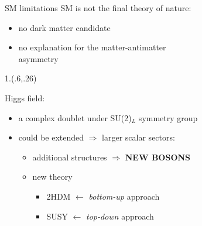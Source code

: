 \documentclass[10pt,UKenglish, leqno, xcolor = dvipsnames]{beamer}
\begin{document}
	\begin{frame}{SM limitations}
		\vfill
		SM is not the final theory of nature:
		\begin{itemize}
			\item no dark matter candidate  
			\item no explanation for the matter-antimatter\\ asymmetry 
		\end{itemize}
		\begin{textblock}{1.}(.6,.26)
		\end{textblock}
		\vspace{1cm}
		Higgs field:
		\begin{itemize}
			\item a complex doublet under SU(2)$_L$ symmetry group
			\item could be extended $\Rightarrow$ larger scalar sectors:
			\begin{itemize}
				\item additional structures $\Rightarrow$ \textbf{NEW BOSONS}
				\item new theory
				\begin{itemize}
					\item 2HDM $\leftarrow$ \textit{bottom-up} approach
					\item SUSY $\leftarrow$ \textit{top-down} approach
				\end{itemize}
			\end{itemize} 
		\end{itemize}
		\vfill
	\end{frame}
\end{document}
